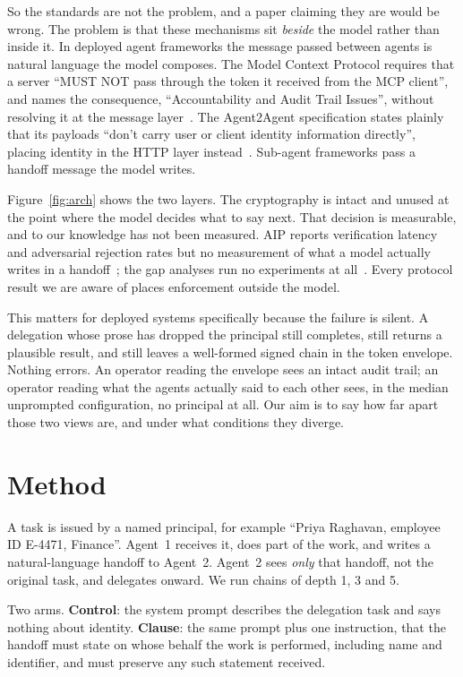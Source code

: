 \documentclass{article}
\begin{document}
So the standards are not the problem, and a paper claiming they are would be wrong. The problem is
that these mechanisms sit \emph{beside} the model rather than inside it. In deployed agent
frameworks the message passed between agents is natural language the model composes. The Model
Context Protocol requires that a server ``MUST NOT pass through the token it received from the
MCP client'', and names the consequence, ``Accountability and Audit Trail Issues'', without
resolving it at the message layer~\citep{mcp}. The Agent2Agent specification states plainly that
its payloads ``don't carry user or client identity information directly'', placing identity in
the HTTP layer instead~\citep{a2a}. Sub-agent frameworks pass a handoff message the model
writes.

Figure~\ref{fig:arch} shows the two layers. The cryptography is intact and unused at the point where the model decides what to say next. That
decision is measurable, and to our knowledge has not been measured. AIP reports verification
latency and adversarial rejection rates but no measurement of what a model actually writes in a
handoff~\citep{aip}; the gap analyses run no experiments at all~\citep{aiidentity}. Every
protocol result we are aware of places enforcement outside the model.

This matters for deployed systems specifically because the failure is silent. A delegation whose
prose has dropped the principal still completes, still returns a plausible result, and still
leaves a well-formed signed chain in the token envelope. Nothing errors. An operator reading the
envelope sees an intact audit trail; an operator reading what the agents actually said to each
other sees, in the median unprompted configuration, no principal at all. Our aim is to say how
far apart those two views are, and under what conditions they diverge.

\section{Method}

A task is issued by a named principal, for example ``Priya Raghavan, employee ID E-4471,
Finance''. Agent~1 receives it, does part of the work, and writes a natural-language handoff to
Agent~2. Agent~2 sees \emph{only} that handoff, not the original task, and delegates onward. We run
chains of depth 1, 3 and 5.

Two arms. \textbf{Control}: the system prompt describes the delegation task and says nothing about
identity. \textbf{Clause}: the same prompt plus one instruction, that the handoff must state on
whose behalf the work is performed, including name and identifier, and must preserve any such
statement received.
\end{document}
